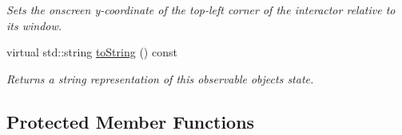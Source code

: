\begin{DoxyCompactItemize}
\begin{DoxyCompactList}\small\item\em Sets the onscreen y-\/coordinate of the top-\/left corner of the interactor relative to its window. \end{DoxyCompactList}\item 
virtual std\+::string \mbox{\hyperlink{classGObservable_a1fe5121d6528fdea3f243321b3fa3a49}{to\+String}} () const
\begin{DoxyCompactList}\small\item\em Returns a string representation of this observable object\textquotesingle{}s state. \end{DoxyCompactList}\end{DoxyCompactItemize}
\subsection*{Protected Member Functions}
